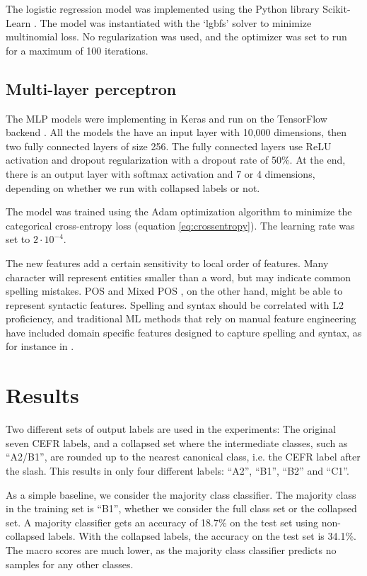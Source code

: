 The logistic regression model was implemented using the Python library
Scikit-Learn \autocite{scikit-learn}. The model was instantiated with the
`lgbfs' solver to minimize multinomial loss. No regularization was used, and
the optimizer was set to run for a maximum of 100 iterations.


\subsection{Multi-layer perceptron}
\label{subsec:mlp}

The MLP models were implementing in Keras \autocite{keras} and run on the
TensorFlow backend \autocite{tensorflow}. All the models the have an input
layer with 10,000 dimensions, then two fully connected layers of size 256.
The fully connected layers use \ac{ReLU} activation and dropout
regularization with a dropout rate of 50\%. At the end, there is an output
layer with softmax activation and 7 or 4 dimensions, depending on whether we
run with collapsed labels or not.

The model was trained using the Adam optimization algorithm
\autocite{kingma2014adam} to minimize the categorical cross-entropy loss
(equation \ref{eq:crossentropy}). The learning rate was set to $2\cdot
10^{-4}$.


The new \ngram features add a certain sensitivity to local order of features.
Many character \ngrams will represent entities smaller than a word, but may
indicate common spelling mistakes. \ac{POS} and Mixed POS \ngrams, on the
other hand, might be able to represent syntactic features. Spelling and
syntax should be correlated with L2 proficiency, and traditional \ac{ML}
methods that rely on manual feature engineering have included domain specific
features designed to capture spelling and syntax, as for instance in
\textcite{vajjala17}.


\section{Results}

Two different sets of output labels are used in the experiments: The original
seven CEFR labels, and a collapsed set where the intermediate classes, such
as ``A2/B1'', are rounded up to the nearest canonical class, i.e. the CEFR
label after the slash. This results in only four different labels: ``A2'',
``B1'', ``B2'' and ``C1''.

As a simple baseline, we consider the majority class classifier. The majority
class in the training set is ``B1'', whether we consider the full class set
or the collapsed set. A majority classifier gets an accuracy of 18.7\% on the
test set using non-collapsed labels. With the collapsed labels, the accuracy
on the test set is 34.1\%. The macro \FI scores are much lower, as the
majority class classifier predicts no samples for any other classes.

